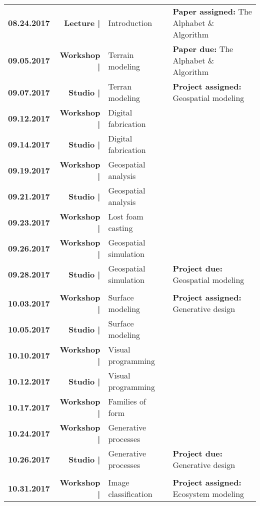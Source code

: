 \documentclass[11pt,article,oneside]{memoir}
\begin{document}
\begin{table}[H]
\small
\begin{tabular}{l r @{\hskip 0.1cm} l @{\hskip 0.5cm} l}
%
\textbf{08.24.2017} & \textbf{Lecture |} & Introduction & \textbf{Paper assigned:} The Alphabet \& Algorithm\\
%
\textbf{09.05.2017} & \textbf{Workshop |} & Terrain modeling & \textbf{Paper due:} The Alphabet \& Algorithm\\
\textbf{09.07.2017} & \textbf{Studio |} & Terran modeling & \textbf{Project assigned:} Geospatial modeling\\
%
\textbf{09.12.2017} & \textbf{Workshop |} & Digital fabrication & \\
\textbf{09.14.2017} & \textbf{Studio |} & Digital fabrication & \\
%
\textbf{09.19.2017} & \textbf{Workshop |} & Geospatial analysis & \\
\textbf{09.21.2017} & \textbf{Studio |} & Geospatial analysis & \\
\textbf{09.23.2017} & \textbf{Workshop |} & Lost foam casting\\
%
\textbf{09.26.2017} & \textbf{Workshop |} & Geospatial simulation & \\
\textbf{09.28.2017} & \textbf{Studio |} & Geospatial simulation  & \textbf{Project due:} Geospatial modeling\\
%
\\
%
\textbf{10.03.2017} & \textbf{Workshop |} & Surface modeling & \textbf{Project assigned:} Generative design\\
\textbf{10.05.2017} & \textbf{Studio |} & Surface modeling & \\
%
\textbf{10.10.2017} & \textbf{Workshop |} & Visual programming & \\
\textbf{10.12.2017} & \textbf{Studio |} & Visual programming & \\
%
\textbf{10.17.2017} & \textbf{Workshop |} & Families of form & \\
%
\textbf{10.24.2017} & \textbf{Workshop |} & Generative processes& \\
\textbf{10.26.2017} & \textbf{Studio |} & Generative processes & \textbf{Project due:} Generative design\\
%
\\
%
\textbf{10.31.2017} & \textbf{Workshop |} & Image classification & \textbf{Project assigned:} Ecosystem modeling\\

\end{tabular}
\end{table}
\end{document}

